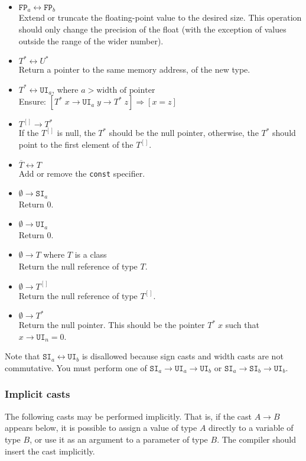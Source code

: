 \documentclass{article}
\newcommand{\R}[1]{\mathtt{#1}}
\newcommand{\both}{\leftrightarrow}
\begin{document}
\begin{itemize}
  \item{$\R{FP}_a \both \R{FP}_b$ \\
    Extend or truncate the floating-point value to the desired size. This
    operation should only change the precision of the float (with the exception
    of values outside the range of the wider number).}
  \item{$T^* \both U^*$ \\
    Return a pointer to the same memory address, of the new type.}
  \item{$T^* \both \R{UI}_a$, where $a > \textrm{width of pointer}$ \\
    Ensure: $[T^*\;x \to \R{UI}_a\;y \to T^*\;z] \Rightarrow [x = z]$}
  \item{$T^{[]} \to T^*$ \\
    If the $T^{[]}$ is null, the $T^*$ should be the null pointer, otherwise,
    the $T^*$ should point to the first element of the $T^{[]}$.}
  \item{$\overline{T} \both T$ \\
    Add or remove the \texttt{const} specifier.}
  \item{$\emptyset \to \R{SI}_a$ \\
    Return $0$.}
  \item{$\emptyset \to \R{UI}_a$ \\
    Return $0$.}
  \item{$\emptyset \to T$ where $T$ is a class \\
    Return the null reference of type $T$.}
  \item{$\emptyset \to T^{[]}$ \\
    Return the null reference of type $T^{[]}$.}
  \item{$\emptyset \to T^*$ \\
    Return the null pointer. This should be the pointer $T^*\;x$ such that
    $x \to \R{UI}_n = 0$.}
\end{itemize}
Note that $\R{SI}_a \both \R{UI}_b$ is disallowed because sign casts and width
casts are not commutative. You must perform one of
$\R{SI}_a \to \R{UI}_a \to \R{UI}_b$ or $\R{SI}_a \to \R{SI}_b \to \R{UI}_b$.
\subsubsection{Implicit casts}
The following casts may be performed implicitly. That is, if the cast
$A \to B$ appears below, it is possible to assign a value of type $A$ directly
to a variable of type $B$, or use it as an argument to a parameter of type
$B$. The compiler should insert the cast implicitly.
\end{document}
